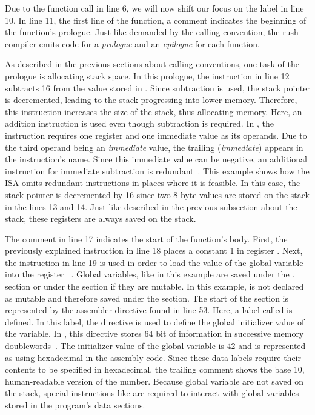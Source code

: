 Due to the function call in line 6, we will now shift our focus on the  label in line 10.
In line 11, the first line of the  function, a comment indicates the beginning of the function's prologue.
Just like demanded by the \riscv{} calling convention, the rush compiler emits code for a \emph{prologue} and an \emph{epilogue} for each function.

As described in the previous sections about calling conventions, one task of the prologue is allocating stack space.
In this prologue, the  instruction in line 12 subtracts 16 from the value stored in .
Since subtraction is used, the stack pointer is decremented, leading to the stack progressing into lower memory.
Therefore, this instruction increases the size of the stack, thus allocating memory.
Here, an addition instruction is used even though subtraction is required.
In \riscv{}, the  instruction requires one register and one immediate value as its operands.
Due to the third operand being an \emph{immediate} value, the trailing  (\emph{immediate}) appears in the instruction's name.
Since this immediate value can be negative, an additional instruction for immediate subtraction is redundant~\cite[reference card]{Patterson2017}.
This example shows how the \riscv{} ISA omits redundant instructions in places where it is feasible.
In this case, the stack pointer is decremented by 16 since two 8-byte values are stored on the stack in the lines 13 and 14.
Just like described in the previous subsection about the stack, these registers are always saved on the stack.

The comment in line 17 indicates the start of the function's body.
First, the previously explained  instruction in line 18 places a constant 1 in register .
Next, the  instruction in line 19 is used in order to load the value of the global variable  into the register ~\cite[reference card]{Patterson2017}.
Global variables, like  in this example are saved under the . section or under the  section if they are mutable.
In this example,  is not declared as mutable and therefore saved under the  section.
The start of the  section is represented by the  assembler directive found in line 53.
Here, a label called  is defined.
In this label, the  directive is used to define the global initializer value of the variable.
In \riscv{}, this directive stores 64 bit of information in successive memory doublewords~\cite[p.~39]{Patterson2017}.
The initializer value of the global variable is 42 and is represented as  using hexadecimal in the assembly code.
Since these data labels require their contents to be specified in hexadecimal, the trailing comment shows the base 10, human-readable version of the number.
Because global variable are not saved on the stack, special instructions like  are required to interact with global variables stored in the program's data sections.


